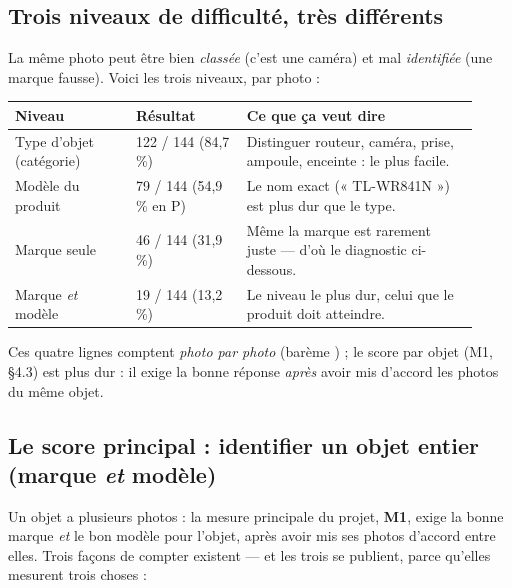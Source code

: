 \documentclass[10pt,a4paper]{article}
\providecommand{\NoAutoSpacing}{}
\newcommand{\code}[1]{{\NoAutoSpacing\ttfamily\detokenize{#1}}}
\begin{document}
\subsection{Trois niveaux de difficulté, très différents}
La même photo peut être bien \emph{classée} (c'est une caméra) et mal \emph{identifiée} (une marque
fausse). Voici les trois niveaux, par photo :
\begin{center}
\footnotesize\sffamily
\begin{tabular}{@{}p{0.24\linewidth}p{0.22\linewidth}p{0.46\linewidth}@{}}
\toprule
\textbf{Niveau} & \textbf{Résultat} & \textbf{Ce que ça veut dire}\\
\midrule
Type d'objet (catégorie) & 122 / 144 (84,7\,\%) & Distinguer routeur, caméra, prise, ampoule, enceinte : le plus facile.\\
Modèle du produit & 79 / 144 (54,9\,\% en P) & Le nom exact (« TL-WR841N ») est plus dur que le type.\\
Marque seule & 46 / 144 (31,9\,\%) & Même la marque est rarement juste — d'où le diagnostic ci-dessous.\\
Marque \emph{et} modèle & 19 / 144 (13,2\,\%) & Le niveau le plus dur, celui que le produit doit atteindre.\\
\bottomrule
\end{tabular}

{\footnotesize\sffamily Ces quatre lignes comptent \emph{photo par photo} (barème \code{audit-grading}) ; le score par objet (M1, §4.3) est plus dur : il exige la bonne réponse \emph{après} avoir mis d'accord les photos du même objet.}
\end{center}

\subsection{Le score principal : identifier un objet entier (marque \emph{et} modèle)}
Un objet a plusieurs photos : la mesure principale du projet, \textbf{M1}, exige la bonne marque
\emph{et} le bon modèle pour l'objet, après avoir mis ses photos d'accord entre elles. Trois façons
de compter existent — et les trois se publient, parce qu'elles mesurent trois choses :
\end{document}
